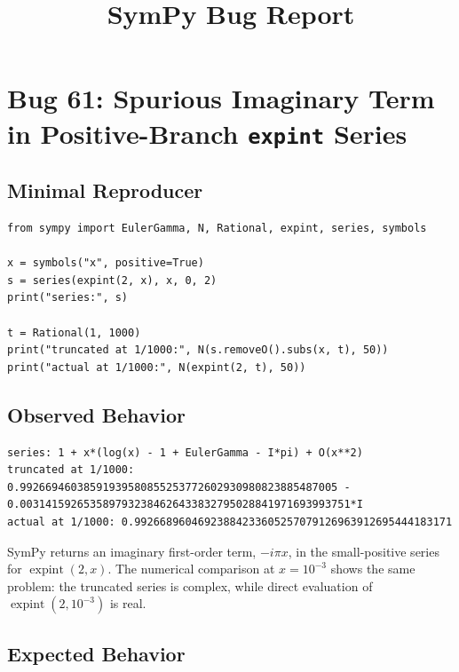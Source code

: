 \documentclass[11pt]{article}
\title{SymPy Bug Report}
\author{}
\date{}
\begin{document}
\maketitle

\section{Bug 61: Spurious Imaginary Term in Positive-Branch \texorpdfstring{\texttt{expint}}{expint} Series}

\subsection{Minimal Reproducer}

\medskip

\begin{lstlisting}[style=bugpython]
from sympy import EulerGamma, N, Rational, expint, series, symbols

x = symbols("x", positive=True)
s = series(expint(2, x), x, 0, 2)
print("series:", s)

t = Rational(1, 1000)
print("truncated at 1/1000:", N(s.removeO().subs(x, t), 50))
print("actual at 1/1000:", N(expint(2, t), 50))
\end{lstlisting}

\subsection{Observed Behavior}

\medskip

\begin{lstlisting}[style=bugpython]
series: 1 + x*(log(x) - 1 + EulerGamma - I*pi) + O(x**2)
truncated at 1/1000: 0.99266946038591939580855253772602930980823885487005 - 0.0031415926535897932384626433832795028841971693993751*I
actual at 1/1000: 0.99266896046923884233605257079126963912695444183171
\end{lstlisting}

SymPy returns an imaginary first-order term, \(-i\pi x\), in the small-positive
series for \(\operatorname{expint}(2,x)\).  The numerical comparison at
\(x=10^{-3}\) shows the same problem: the truncated series is complex, while
direct evaluation of \(\operatorname{expint}(2,10^{-3})\) is real.

\subsection{Expected Behavior}
\end{document}

